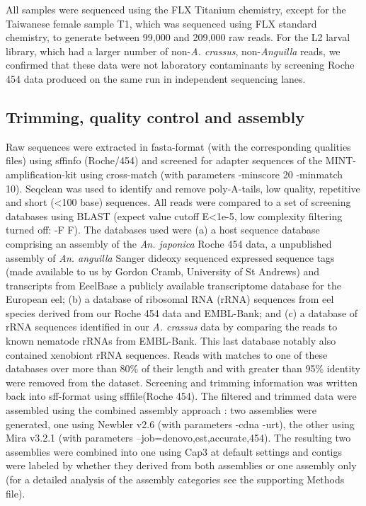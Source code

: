 \documentclass[10pt]{bmc_article}
\newenvironment{bmcformat}{\begin{raggedright}\baselineskip20pt\sloppy\setboolean{publ}{false}}{\end{raggedright}\baselineskip20pt\sloppy}
\begin{document}
\begin{bmcformat}
All samples were sequenced using the FLX Titanium chemistry, except
for the Taiwanese female sample T1, which was sequenced using FLX
standard chemistry, to generate between 99,000 and 209,000 raw
reads. For the L2 larval library, which had a larger number of
non-\textit{A. crassus}, non-\textit{Anguilla} reads, we confirmed
that these data were not laboratory contaminants by screening Roche
454 data produced on the same run in independent sequencing lanes.

\subsection*{Trimming, quality control and assembly}

Raw sequences were extracted in fasta-format (with the corresponding
qualities files) using sffinfo (Roche/454) and screened for adapter
sequences of the MINT-amplification-kit using cross-match \cite{PHRAP}
(with parameters -minscore 20 -minmatch 10). Seqclean
\cite{tgicl_pertea} was used to identify and remove poly-A-tails, low
quality, repetitive and short (<100 base) sequences. All reads were
compared to a set of screening databases using BLAST (expect value
cutoff E<1e-5, low complexity filtering turned off: -F F). The
databases used were (a) a host sequence database comprising an
assembly of the \textit{An. japonica} Roche 454 data, a unpublished
assembly of \textit{An. anguilla} Sanger dideoxy sequenced expressed
sequence tags (made available to us by Gordon Cramb, University of St
Andrews) and transcripts from EeelBase \cite{pmid21080939} a publicly
available transcriptome database for the European eel; (b) a database
of ribosomal RNA (rRNA) sequences from eel species derived from our
Roche 454 data and EMBL-Bank; and (c) a database of rRNA sequences
identified in our \textit{A. crassus} data by comparing the reads to
known nematode rRNAs from EMBL-Bank. This last database notably also
contained xenobiont rRNA sequences. Reads with matches to one of these
databases over more than 80\% of their length and with greater than
95\% identity were removed from the dataset. Screening and trimming
information was written back into sff-format using sfffile(Roche
454). The filtered and trimmed data were assembled using the combined
assembly approach \cite{pmid20950480}: two assemblies were generated,
one using Newbler v2.6 \cite{pmid16056220} (with parameters -cdna
-urt), the other using Mira v3.2.1 \cite{miraEST} (with parameters
--job=denovo,est,accurate,454). The resulting two assemblies were
combined into one using Cap3 \cite{Cap3_Huang} at default settings and
contigs were labeled by whether they derived from both assemblies or
one assembly only (for a detailed analysis of the assembly categories
see the supporting Methods file).


\end{bmcformat}
\end{document}
